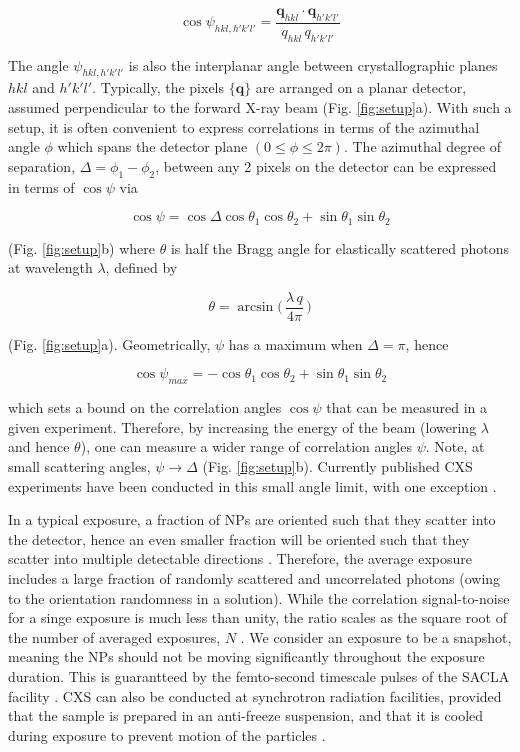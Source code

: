 \documentclass [12pt,fleqn]{article}
\def \be {\begin{equation}}
\def \ee {\end{equation}}
\begin{document}
\be \label{hklcorr}
\cos \psi_{hkl,h'k'l'}  =\frac{ \bm q_{hkl} \cdot \bm q_{h'k'l'} } {q_{hkl}\, q_{h'k'l'}} 
\ee

The angle $\psi_{hkl,h'k'l'}$ is also the interplanar angle between crystallographic planes $hkl$ and $h'k'l'$. Typically, the pixels $\{\bm q\}$ are arranged on a planar detector, assumed perpendicular to the forward X-ray beam (Fig. \ref{fig:setup}a). With such a setup, it is often convenient to express correlations in terms of the azimuthal angle $\phi$ which spans the detector plane $(0 \le \phi \le 2\pi)$. The azimuthal degree of separation, $\Delta = \phi_1  - \phi_2$, between any 2 pixels on the detector can be expressed in terms of $\cos \psi$ via

\be \label{project}
\cos \psi  = \cos  \Delta  \cos  \theta_1 \cos \theta_2 + \sin \theta_1 \sin \theta_2
\ee

(Fig. \ref{fig:setup}b) where $\theta$ is half the Bragg angle for elastically scattered photons at wavelength $\lambda$, defined by

\be
\theta  = \arcsin \big( \,\frac{ \lambda\,q  }{ 4\pi }\, \big )
\ee

(Fig. \ref{fig:setup}a). Geometrically, $\psi$ has a maximum when $\Delta=\pi$, hence

\be \label{psimax}
\cos \psi_{max} = - \cos \theta_1 \cos \theta_2  + \sin \theta_1 \sin \theta_2
\ee


which sets a bound on the correlation angles $\cos \psi$ that can be measured in a given experiment. Therefore, by increasing the energy of the beam (lowering $\lambda$ and hence $\theta$), one can measure a wider range of correlation angles $\psi$. Note, at small scattering angles, $\psi \rightarrow \Delta$ (Fig. \ref{fig:setup}b). Currently published CXS experiments have been conducted in this small angle limit, with one exception \cite{mendez2014observation}.

In a typical exposure, a fraction of NPs are oriented such that they scatter into the detector, hence an even smaller fraction will be oriented such that they scatter into multiple detectable directions \cite{mendez2014observation}. Therefore, the average exposure includes a large fraction of randomly scattered and uncorrelated photons (owing to the orientation randomness in a solution). While the correlation signal-to-noise for a singe exposure is much less than unity, the ratio scales as the square root of the number of averaged exposures, $N$ \cite{kirian2011signal}. We consider an exposure to be a snapshot, meaning the NPs should not be moving significantly throughout the exposure duration. This is guarantteed by the femto-second timescale pulses of the SACLA facility \cite{neutze2000potential}. CXS can also be conducted at synchrotron radiation facilities, provided that the sample is prepared in an anti-freeze suspension, and that it is cooled during exposure to prevent motion of the particles \cite{kam1981fluctuation, mendez2014observation}. 
\end{document}
